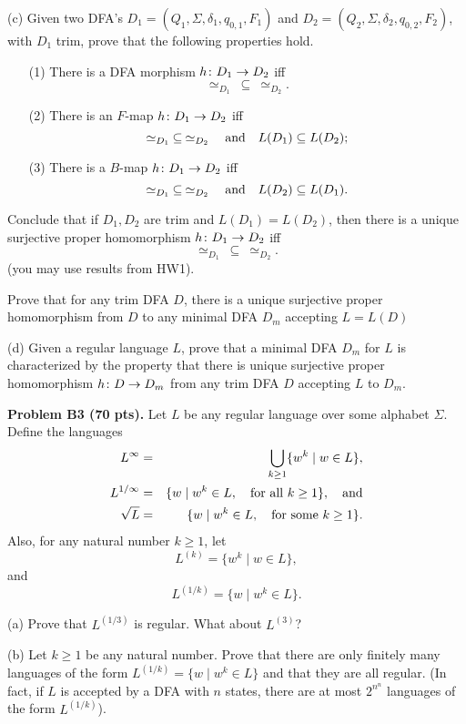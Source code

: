 \documentclass[12pt]{article}
\begin{document}
\medskip
(c)
Given two  DFA's
$D_1 = (Q_1, \Sigma, \delta_1, q_{0, 1}, F_1)$
and 
$D_2 = (Q_2, \Sigma, \delta_2, q_{0, 2}, F_2)$,
with  $D_1$  trim,
prove that the following properties hold.
\begin{enumerate}
\item[(1)]
There is a DFA morphism $h\colon D_1\rightarrow D_2$
iff 
\[\simeq_{D_1}\>\subseteq\>\simeq_{D_2}.\]
\item[(2)]
There is an  $F$-map
$h\colon D_1\rightarrow D_2$ iff
\[\simeq_{D_1}\>\subseteq\> \simeq_{D_2}
\quad\hbox{and}\quad
L(D_1) \subseteq  L(D_2);\]
\item[(3)]
There is a $B$-map
$h\colon D_1\rightarrow D_2$ iff
\[\simeq_{D_1}\>\subseteq\> \simeq_{D_2}
\quad\hbox{and}\quad
L(D_2) \subseteq  L(D_1).\]
\end{enumerate}

Conclude that if  $D_1, D_2$ are trim and
$L(D_1) = L(D_2)$, then
there is a unique surjective proper homomorphism
$h\colon D_1\rightarrow D_2$ iff
$$\simeq_{D_1}\>\subseteq\> \simeq_{D_2}.$$
(you may use results from  HW1).

\medskip
Prove that for any trim DFA $D$, there
is a unique surjective proper homomorphism
from $D$ to any minimal DFA
$D_m$ accepting $L = L(D)$

\medskip
(d) 
Given a regular language $L$,
prove that a minimal DFA $D_m$ for $L$ is 
characterized by the property that there is unique surjective
proper homomorphism
$h\colon D\rightarrow D_m$ from any trim DFA $D$ accepting $L$ to $D_m$.




\vspace{0.25cm}\noindent
{\bf Problem B3 (70 pts).} 
Let $L$ be any regular language
over some alphabet $\Sigma$.  Define the languages
\begin{eqnarray*}
L^{\infty} & = & \bigcup_{k\geq 1} \{w^k \mid w \in  L\}, \\
L^{1/\infty} & = & \{w \mid  w^k \in  L,\quad \hbox{for all $k\geq 1$}\},
\quad\hbox{and} \\
\sqrt{L} & = &\{w \mid  w^k \in  L,\quad \hbox{for some $k\geq 1$}\}.
\end{eqnarray*}
Also, for any natural number $k \geq 1$, let
\[L^{(k)} = \{w^k \mid  w \in  L\},\] 
and
\[L^{(1/k)} = \{w \mid  w^k \in  L\}.\] 

\medskip
(a)
Prove that $L^{(1/3)}$ is regular. What about $L^{(3)}$?

\medskip
(b)
Let $k\geq 1$ be any natural number.
Prove that there are only finitely many languages
of the form  $L^{(1/k)} = \{w \mid  w^k \in  L\}$
and that they are all regular.
(In fact, if $L$ is accepted by a DFA with $n$ states, there
are at most $2^{n^n}$ languages of the form $L^{(1/k)}$).
\end{document}
